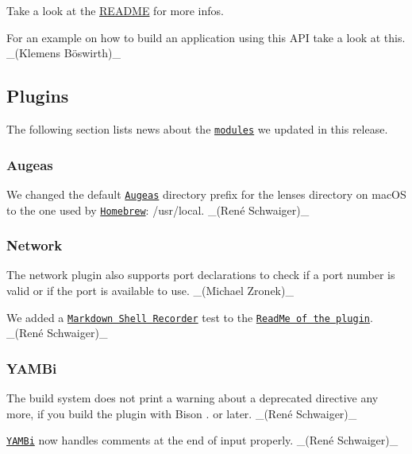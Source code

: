 Take a look at the \hyperlink{src_libs_highlevel_README_md}{R\+E\+A\+D\+ME} for more infos.

For an example on how to build an application using this A\+PI take a look at this. \+\_\+(Klemens Böswirth)\+\_\+

\subsection*{Plugins}

The following section lists news about the \href{https://www.libelektra.org/plugins/readme}{\tt modules} we updated in this release.

\subsubsection*{Augeas}


\begin{DoxyItemize}
\item We changed the default \href{http://augeas.net}{\tt Augeas} directory prefix for the lenses directory on mac\+OS to the one used by \href{https://brew.sh}{\tt Homebrew}\+: {\ttfamily /usr/local}. \+\_\+(René Schwaiger)\+\_\+
\end{DoxyItemize}

\subsubsection*{Network}


\begin{DoxyItemize}
\item The {\ttfamily network} plugin also supports port declarations to check if a port number is valid or if the port is available to use. \+\_\+(\+Michael Zronek)\+\_\+
\item We added a \href{https://master.libelektra.org/tests/shell/shell_recorder/tutorial_wrapper}{\tt Markdown Shell Recorder} test to the \href{https://www.libelektra.org/plugins/network}{\tt Read\+Me of the plugin}. \+\_\+(René Schwaiger)\+\_\+
\end{DoxyItemize}

\subsubsection*{Y\+A\+M\+Bi}


\begin{DoxyItemize}
\item The build system does not print a warning about a deprecated directive any more, if you build the plugin with Bison {.} or later. \+\_\+(René Schwaiger)\+\_\+
\item \href{https://www.libelektra.org/plugins/yambi}{\tt Y\+A\+M\+Bi} now handles comments at the end of input properly. \+\_\+(René Schwaiger)\+\_\+
\end{DoxyItemize}

